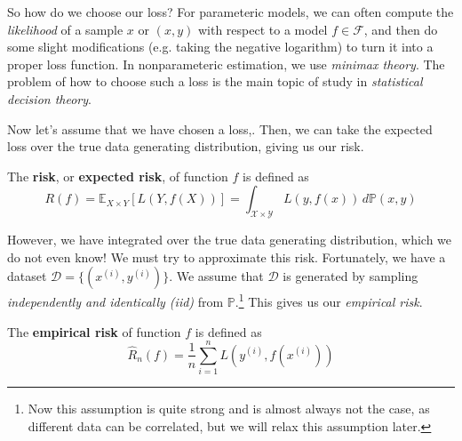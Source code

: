 So how do we choose our loss? For parameteric models, we can often compute the \textit{likelihood} of a sample $x$ or $(x, y)$ with respect to a model $f \in \mathcal{F}$, and then do some slight modifications (e.g. taking the negative logarithm) to turn it into a proper loss function. In nonparameteric estimation, we use \textit{minimax theory}. The problem of how to choose such a loss is the main topic of study in \textit{statistical decision theory}. 

Now let's assume that we have chosen a loss,. Then, we can take the expected loss over the true data generating distribution, giving us our risk. 

\begin{definition}[Risk]
  \label{def:risk}
  The \textbf{risk}, or \textbf{expected risk}, of function $f$ is defined as 
  \begin{equation}
    R(f) = \mathbb{E}_{X \times Y} [ L(Y, f(X))] = \int_{\mathcal{X} \times \mathcal{Y}} L(y, f(x)) \,d\mathbb{P}(x, y)
  \end{equation}
\end{definition}

However, we have integrated over the true data generating distribution, which we do not even know! We must try to approximate this risk. Fortunately, we have a dataset $\mathcal{D} = \{(x^{(i)}, y^{(i)})\}$. We assume that $\mathcal{D}$ is generated by sampling \textit{independently and identically (iid)} from $\mathbb{P}$.\footnote{Now this assumption is quite strong and is almost always not the case, as different data can be correlated, but we will relax this assumption later.} This gives us our \textit{empirical risk}. 

\begin{definition}
  \label{def:empirical-risk}
  The \textbf{empirical risk} of function $f$ is defined as 
  \begin{equation}
    \hat{R}_n(f) = \frac{1}{n} \sum_{i=1}^n L(y^{(i)}, f(x^{(i)}))
  \end{equation}
\end{definition}

